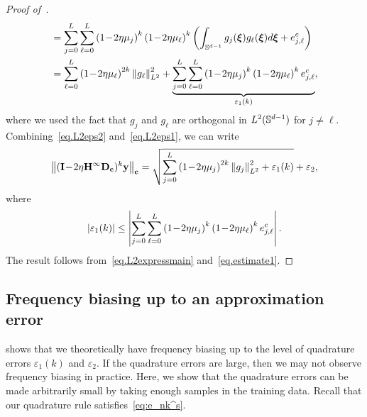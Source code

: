 \begin{proof}[Proof of~]
\begin{align}
    &= \sum_{j=0}^L \sum_{\ell=0}^L \left(1\!-\!2\eta\mu_j\right)^k \left(1\!-\!2\eta\mu_\ell\right)^k \left(\int_{\sS^{d-1}} g_j(\boldsymbol{\xi}) g_\ell(\boldsymbol{\xi}) d\boldsymbol{\xi} + e^c_{j,\ell}\right) \nonumber \\
    &= \sum_{\ell=0}^L \left(1\!-\!2\eta\mu_\ell\right)^{2k} \norm{g_\ell}^2_{L^2} + \underbrace{\sum_{j=0}^L \sum_{\ell=0}^L \left(1\!-\!2\eta\mu_j\right)^k \left(1\!-\!2\eta\mu_\ell\right)^k e^c_{j,\ell}}_{\varepsilon_1(k)}, \label{eq.L2eps1}
\end{align}
where we used the fact that $g_j$ and $g_\ell$ are orthogonal in $L^2({\mathbb{S}}^{d-1})$ for $j \neq \ell$. Combining~\cref{eq.L2eps2} and~\cref{eq.L2eps1}, we can write
\begin{align}\label{eq.estimate1}
    \left\lVert(\mathbf{I} \!-\! 2\eta {\mathbf{H}}^\infty\mathbf{D}_\mathbf{\boldsymbol{c}})^{k}\mathbf{y}\right\rVert_{\mathbf{c}} = \sqrt{\sum_{j=0}^L \left(1\!-\!2\eta\mu_j\right)^{2k} \left\lVert g_j\right\rVert^2_{L^2} + \varepsilon_1(k)} + \varepsilon_2,
\end{align}
where
\begin{equation*}
    \left|\varepsilon_1(k)\right| \leq \left|\sum_{j=0}^L \sum_{\ell=0}^L \left(1\!-\!2\eta\mu_j\right)^k \left(1\!-\!2\eta\mu_\ell\right)^k e^c_{j,\ell}\right|.
\end{equation*}
The result follows from~\cref{eq.L2expressmain} and~\cref{eq.estimate1}.
\end{proof}

\subsection{Frequency biasing up to an approximation error}
 shows that we theoretically have frequency biasing up to the level of quadrature errors $\varepsilon_1(k)$ and $\varepsilon_2$. If the quadrature errors are large, then we may not observe frequency biasing in practice. Here, we show that the quadrature errors can be made arbitrarily small by taking enough samples in the training data. Recall that our quadrature rule satisfies~\cref{eq:e_nk^s}.

